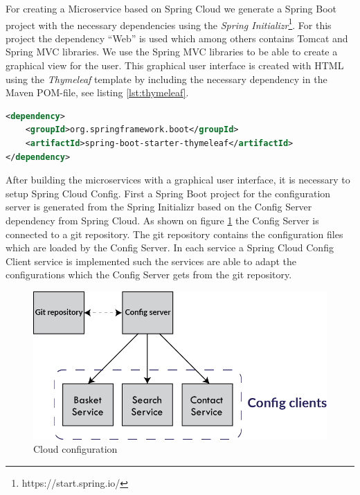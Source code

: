 For creating a Microservice based on Spring Cloud we generate a Spring Boot project with the necessary dependencies using the \emph{Spring Initializr}\footnote{https://start.spring.io/}. For this project the dependency ``Web'' is used which among others contains Tomcat and Spring MVC libraries. We use the Spring MVC libraries to be able to create a graphical view for the user. This graphical user interface is created with HTML using the \emph{Thymeleaf} template by including the necessary dependency in the Maven POM-file, see listing \ref{lst:thymeleaf}. 
\begin{lstlisting}[caption={Thymeleaf dependency in POM-file},label={lst:thymeleaf}, language=XML, frame=single, ]
<dependency>
	<groupId>org.springframework.boot</groupId>
	<artifactId>spring-boot-starter-thymeleaf</artifactId>
</dependency>
\end{lstlisting}
After building the microservices with a graphical user interface, it is necessary to setup Spring Cloud Config.
First a Spring Boot project for the configuration server is generated from the Spring Initializr based on the Config Server dependency from Spring Cloud. As shown on figure \ref{fig:cloud-config} the Config Server is connected to a git repository. The git repository contains the configuration files which are loaded by the Config Server. In each service a Spring Cloud Config Client service is implemented such the services are able to adapt the configurations which the Config Server gets from the git repository.  
\begin{figure}[bth]
	\includegraphics[width=1\linewidth]{gfx/cloud-config}
	\caption[cloudconfig]{Cloud configuration} \label{fig:cloud-config}
\end{figure}    

